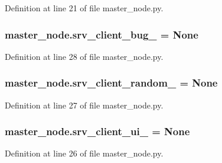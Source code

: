 Definition at line 21 of file master\+\_\+node.\+py.

\subsubsection[{\texorpdfstring{srv\+\_\+client\+\_\+bug\+\_\+}{srv_client_bug_}}]{\setlength{\rightskip}{0pt plus 5cm}master\+\_\+node.\+srv\+\_\+client\+\_\+bug\+\_\+ = None}\hypertarget{namespacemaster__node_ae7e05351b023ff9491aab8db55411203}{}\label{namespacemaster__node_ae7e05351b023ff9491aab8db55411203}


Definition at line 28 of file master\+\_\+node.\+py.

\subsubsection[{\texorpdfstring{srv\+\_\+client\+\_\+random\+\_\+}{srv_client_random_}}]{\setlength{\rightskip}{0pt plus 5cm}master\+\_\+node.\+srv\+\_\+client\+\_\+random\+\_\+ = None}\hypertarget{namespacemaster__node_a042ea25cd5902ccb0c1d8e6b752b32cd}{}\label{namespacemaster__node_a042ea25cd5902ccb0c1d8e6b752b32cd}


Definition at line 27 of file master\+\_\+node.\+py.

\subsubsection[{\texorpdfstring{srv\+\_\+client\+\_\+ui\+\_\+}{srv_client_ui_}}]{\setlength{\rightskip}{0pt plus 5cm}master\+\_\+node.\+srv\+\_\+client\+\_\+ui\+\_\+ = None}\hypertarget{namespacemaster__node_aa24ec2707042d83db651789d2416066f}{}\label{namespacemaster__node_aa24ec2707042d83db651789d2416066f}


Definition at line 26 of file master\+\_\+node.\+py.


